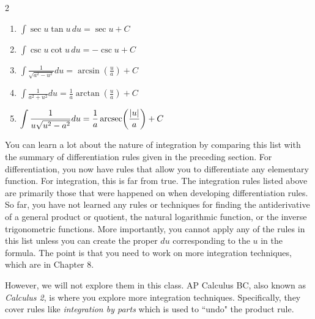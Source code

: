 \documentclass[12pt, letterpaper]{article}
\DeclareMathOperator{\arcsec}{arcsec}
\begin{document}
\begin{definition}[title=Basic Integration Rules ($a>0$)]
\begin{multicols}{2}
\begin{enumerate}
    \item $\displaystyle \int \sec u \tan u\,du
    = \sec u + C$
    
    \item $\displaystyle \int \csc u \cot u\,du
    = -\csc u + C$
    
    \item $\displaystyle \int \frac{1}{\sqrt{a^{2}-u^{2}}}du
    = \arcsin\!\left(\frac{u}{a}\right)+C$
    
    \item $\displaystyle \int \frac{1}{a^{2}+u^{2}}du
    = \frac{1}{a}\arctan\!\left(\frac{u}{a}\right)+C$
    
    \item $\displaystyle \int \frac{1}{u\sqrt{u^{2}-a^{2}}}du
    \\= \frac{1}{a}\arcsec\!\left(\frac{|u|}{a}\right)+C$
    \end{enumerate}
    \end{multicols}

\end{definition}
You can learn a lot about the nature of integration by comparing this list with the summary of differentiation rules given in the preceding section. For differentiation, you now have rules that allow you to differentiate any elementary function. For integration, this is far from true.
The integration rules listed above are primarily those that were happened on when developing differentiation rules. So far, you have not learned any rules or techniques for finding the antiderivative of a general product or quotient, the natural logarithmic function, or the inverse trigonometric functions. More importantly, you cannot apply any of the rules in this list unless you can create the proper $du$ corresponding to the $u$ in the formula. The point is that you need to work on more integration techniques, which are in Chapter 8. 

However, we will not explore them in this class. AP Calculus BC, also known as \textit{Calculus 2}, is where you explore more integration techniques. Specifically, they cover rules like \textit{integration by parts} which is used to ``undo" the product rule.
\end{document}
